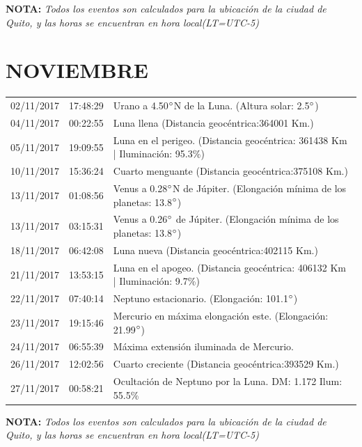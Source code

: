 \documentclass[12pt,a4paper,oneside]{article}
\begin{document}
\vspace{1cm}
\textbf{NOTA:  }\textit{Todos los eventos son calculados para la ubicaci\'on de la ciudad de Quito, y las horas se encuentran en hora local(LT=UTC-5)}
\vspace{0.7cm}
\newpage
\section{NOVIEMBRE}
\begin{center}
\begin{tabular}{ |l| l| l| }
\hline
02/11/2017& 17:48:29 &	Urano a 4.50$\degree $N de la Luna. (Altura solar: 2.5$\degree $)	\\
04/11/2017& 00:22:55 &	Luna llena (Distancia geocéntrica:364001 Km.)	\\
05/11/2017& 19:09:55 &	Luna en el perigeo. (Distancia geocéntrica: 361438 Km | Iluminación: 95.3\%)	\\
10/11/2017& 15:36:24 &	Cuarto menguante (Distancia geocéntrica:375108 Km.)	\\
13/11/2017& 01:08:56 &	Venus a 0.28$\degree $N de Júpiter. (Elongación mínima de los planetas: 13.8$\degree $)	\\
13/11/2017& 03:15:31 &	Venus a 0.26$\degree $ de Júpiter. (Elongación mínima de los planetas: 13.8$\degree $)	\\
18/11/2017& 06:42:08 &	Luna nueva (Distancia geocéntrica:402115 Km.)	\\
21/11/2017& 13:53:15 &	Luna en el apogeo. (Distancia geocéntrica: 406132 Km | Iluminación: 9.7\%)	\\
22/11/2017& 07:40:14 &	Neptuno estacionario. (Elongación: 101.1$\degree $)	\\
23/11/2017& 19:15:46 &	Mercurio en máxima elongación este. (Elongación: 21.99$\degree $)	\\
24/11/2017& 06:55:39 &	Máxima extensión iluminada de Mercurio. 	\\
26/11/2017& 12:02:56 &	Cuarto creciente (Distancia geocéntrica:393529 Km.)	\\
27/11/2017& 00:58:21 &	Ocultación de Neptuno por la Luna. DM: 1.172 Ilum: 55.5\% 	\\\hline
\end{tabular}
\end{center}
\vspace{1cm}
\textbf{NOTA:  }\textit{Todos los eventos son calculados para la ubicaci\'on de la ciudad de Quito, y las horas se encuentran en hora local(LT=UTC-5)}
\vspace{0.7cm}
\newpage
\end{document}

